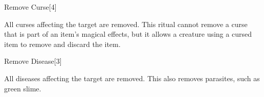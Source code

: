 \begin{spellsection}{Remove Curse}[4]
    \begin{spellheader}
    \end{spellheader}
    \begin{spellcontent}
        \begin{spelltargetinginfo}
        \end{spelltargetinginfo}
        \begin{spelleffects}

            \spelleffect All curses affecting the target are removed. This ritual cannot remove a curse that is part of an item's magical effects, but it allows a creature using a cursed item to remove and discard the item.
        \end{spelleffects}
    \end{spellcontent}
    \begin{spellfooter}
    \end{spellfooter}
\end{spellsection}

\begin{spellsection}{Remove Disease}[3]
    \begin{spellheader}
    \end{spellheader}
    \begin{spellcontent}
        \begin{spelltargetinginfo}
        \end{spelltargetinginfo}
        \begin{spelleffects}

            \spelleffect All diseases affecting the target are removed. This also removes parasites, such as green slime.
        \end{spelleffects}
    \end{spellcontent}
    \begin{spellfooter}
    \end{spellfooter}
\end{spellsection}

